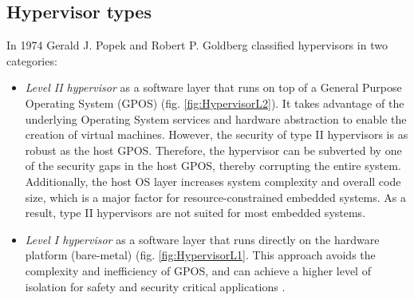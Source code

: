 \subsection{Hypervisor types}
In 1974 Gerald J. Popek and Robert P. Goldberg \cite{popek1974formal} classified hypervisors in two categories:
\begin{itemize}
\item \emph{Level II hypervisor} as a software layer that runs on top of a General Purpose Operating System (GPOS) \cite{Kleidermacher2013} (fig. \ref{fig:HypervisorL2}). It takes advantage of the underlying Operating System services and hardware abstraction to enable the creation of virtual machines. However, the security of type II hypervisors is as robust as the host GPOS. Therefore, the hypervisor can be subverted by one of the security gaps in the host GPOS, thereby corrupting the entire system. Additionally, the host OS layer increases system complexity and overall code size, which is a major factor for resource-constrained embedded systems. As a result, type II hypervisors are not suited for most embedded systems.
\item \emph{Level I hypervisor} as a software layer that runs directly on the hardware platform (bare-metal) (fig. \ref{fig:HypervisorL1}. This approach avoids the complexity and inefficiency of GPOS, and can achieve a higher level of isolation for safety and security critical applications \cite{Kleidermacher2013}.
\end{itemize}


